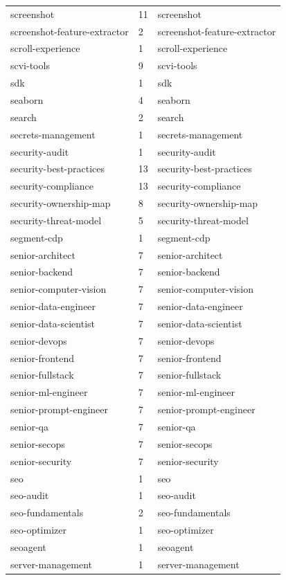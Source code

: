 \begin{longtable}{@{}lll@{}}
screenshot & 11 & screenshot\\
screenshot-feature-extractor & 2 & screenshot-feature-extractor\\
scroll-experience & 1 & scroll-experience\\
scvi-tools & 9 & scvi-tools\\
sdk & 1 & sdk\\
seaborn & 4 & seaborn\\
search & 2 & search\\
secrets-management & 1 & secrets-management\\
security-audit & 1 & security-audit\\
security-best-practices & 13 & security-best-practices\\
security-compliance & 13 & security-compliance\\
security-ownership-map & 8 & security-ownership-map\\
security-threat-model & 5 & security-threat-model\\
segment-cdp & 1 & segment-cdp\\
senior-architect & 7 & senior-architect\\
senior-backend & 7 & senior-backend\\
senior-computer-vision & 7 & senior-computer-vision\\
senior-data-engineer & 7 & senior-data-engineer\\
senior-data-scientist & 7 & senior-data-scientist\\
senior-devops & 7 & senior-devops\\
senior-frontend & 7 & senior-frontend\\
senior-fullstack & 7 & senior-fullstack\\
senior-ml-engineer & 7 & senior-ml-engineer\\
senior-prompt-engineer & 7 & senior-prompt-engineer\\
senior-qa & 7 & senior-qa\\
senior-secops & 7 & senior-secops\\
senior-security & 7 & senior-security\\
seo & 1 & seo\\
seo-audit & 1 & seo-audit\\
seo-fundamentals & 2 & seo-fundamentals\\
seo-optimizer & 1 & seo-optimizer\\
seoagent & 1 & seoagent\\
server-management & 1 & server-management\\

\end{longtable}

